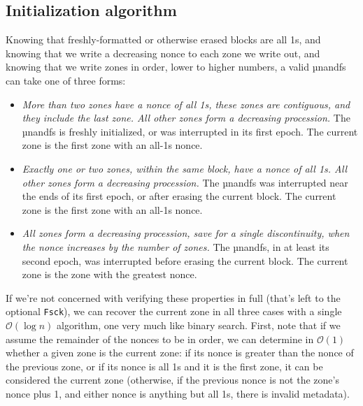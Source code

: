 \documentclass[letterpaper,10pt]{article}
\newenvironment{denseitemize}{
  \begin{itemize}
      \setlength{\itemsep}{0pt}
}{
  \end{itemize}
}
\begin{document}
\subsection{Initialization algorithm} \label{callzones}
Knowing that freshly-formatted or otherwise erased blocks are all 1s, and
knowing that we write a decreasing nonce to each zone we write out, and knowing
that we write zones in order, lower to higher numbers, a valid µnandfs can take
one of three forms:
\begin{denseitemize}
\item \textit{More than two zones have a nonce of all 1s, these zones are
    contiguous, and they include the last zone. All other zones form a
    decreasing procession.} The µnandfs is freshly initialized, or was interrupted
    in its first epoch. The current zone is the first zone with an
    all-1s nonce.
\item \textit{Exactly one or two zones, within the same block, have a nonce of
    all 1s. All other zones form a decreasing procession.} The µnandfs was
  interrupted near the ends of its first epoch, or after erasing the current
  block.  The current zone is the first zone with an all-1s nonce.
\item \textit{All zones form a decreasing procession, save for a single discontinuity,
    when the nonce increases by the number of zones.} The µnandfs, in at least
    its second epoch, was interrupted before erasing the current block.
    The current zone is the zone with the greatest nonce.
\end{denseitemize}
If we're not concerned with verifying these properties in full (that's left to
the optional \texttt{Fsck}), we can recover the current zone in all three cases
with a single $\mathcal{O}(\log{}n)$ algorithm, one very much like binary search. First, note that if we
assume the remainder of the nonces to be in order, we can determine in $\mathcal{O}(1)$ 
whether a given zone is the current zone: if its nonce is greater than the
nonce of the previous zone, or if its nonce is all 1s and it is the first zone,
it can be considered the current zone (otherwise, if the previous nonce is not the
zone's nonce plus 1, and either nonce is anything but all 1s, there is
invalid metadata).
\end{document}
